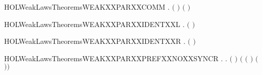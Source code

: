 \newcommand{\HOLWeakLawsTheoremsWEAKXXPARXXASSOC}{\UseVerbatim{HOLWeakLawsTheoremsWEAKXXPARXXASSOC}}
\begin{SaveVerbatim}{HOLWeakLawsTheoremsWEAKXXPARXXCOMM}
\HOLTokenTurnstile{} \HOLSymConst{\HOLTokenForall{}} .  \ensuremath{(} \HOLSymConst{\ensuremath{\mid}} \ensuremath{)} \ensuremath{(} \HOLSymConst{\ensuremath{\mid}} \ensuremath{)}
\end{SaveVerbatim}
\newcommand{\HOLWeakLawsTheoremsWEAKXXPARXXCOMM}{\UseVerbatim{HOLWeakLawsTheoremsWEAKXXPARXXCOMM}}
\begin{SaveVerbatim}{HOLWeakLawsTheoremsWEAKXXPARXXIDENTXXL}
\HOLTokenTurnstile{} \HOLSymConst{\HOLTokenForall{}}.  \ensuremath{(} \HOLSymConst{\ensuremath{\mid}} \ensuremath{)} 
\end{SaveVerbatim}
\newcommand{\HOLWeakLawsTheoremsWEAKXXPARXXIDENTXXL}{\UseVerbatim{HOLWeakLawsTheoremsWEAKXXPARXXIDENTXXL}}
\begin{SaveVerbatim}{HOLWeakLawsTheoremsWEAKXXPARXXIDENTXXR}
\HOLTokenTurnstile{} \HOLSymConst{\HOLTokenForall{}}.  \ensuremath{(} \HOLSymConst{\ensuremath{\mid}} \ensuremath{)} 
\end{SaveVerbatim}
\newcommand{\HOLWeakLawsTheoremsWEAKXXPARXXIDENTXXR}{\UseVerbatim{HOLWeakLawsTheoremsWEAKXXPARXXIDENTXXR}}
\begin{SaveVerbatim}{HOLWeakLawsTheoremsWEAKXXPARXXPREFXXNOXXSYNCR}
\HOLTokenTurnstile{} \HOLSymConst{\HOLTokenForall{}} .
        \HOLSymConst{\HOLTokenNotEqual{}}   \HOLSymConst{\HOLTokenImp{}}
       \HOLSymConst{\HOLTokenForall{}} .
            \ensuremath{(} \HOLSymConst{\ensuremath{\ldotp}} \HOLSymConst{\ensuremath{\mid}}  \HOLSymConst{\ensuremath{\ldotp}}\ensuremath{)}
             \ensuremath{(} \HOLSymConst{\ensuremath{\ldotp}}\ensuremath{(} \HOLSymConst{\ensuremath{\mid}}  \HOLSymConst{\ensuremath{\ldotp}}\ensuremath{)} \HOLSymConst{\ensuremath{+}}
               \HOLSymConst{\ensuremath{\ldotp}}\ensuremath{(} \HOLSymConst{\ensuremath{\ldotp}} \HOLSymConst{\ensuremath{\mid}} \ensuremath{)}\ensuremath{)}
\end{SaveVerbatim}
